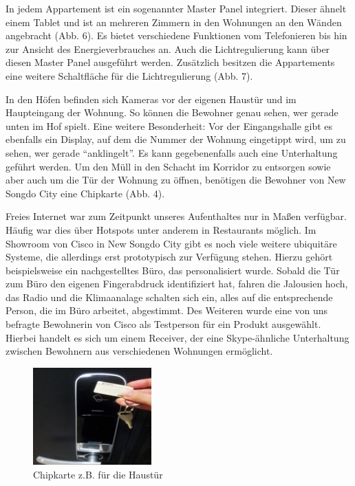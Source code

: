 \documentclass[a4paper,
fontsize=11pt,
oneside,
numbers=noperiodatend,
parskip=half-,
bibliography=totoc,
final
]{scrartcl}
\begin{document}
In jedem Appartement ist ein sogenannter Master Panel integriert. Dieser
ähnelt einem Tablet und ist an mehreren Zimmern in den Wohnungen an den
Wänden angebracht (Abb. 6). Es bietet verschiedene Funktionen vom
Telefonieren bis hin zur Ansicht des Energieverbrauches an. Auch die
Lichtregulierung kann über diesen Master Panel ausgeführt werden.
Zusätzlich besitzen die Appartements eine weitere Schaltfläche für die
Lichtregulierung (Abb. 7).

In den Höfen befinden sich Kameras vor der eigenen Haustür und im
Haupteingang der Wohnung. So können die Bewohner genau sehen, wer gerade
unten im Hof spielt. Eine weitere Besonderheit: Vor der Eingangshalle
gibt es ebenfalls ein Display, auf dem die Nummer der Wohnung eingetippt
wird, um zu sehen, wer gerade \enquote{anklingelt}. Es kann
gegebenenfalls auch eine Unterhaltung geführt werden. Um den Müll in den
Schacht im Korridor zu entsorgen sowie aber auch um die Tür der Wohnung
zu öffnen, benötigen die Bewohner von New Songdo City eine Chipkarte
(Abb. 4).

Freies Internet war zum Zeitpunkt unseres Aufenthaltes nur in Maßen
verfügbar. Häufig war dies über Hotspots unter anderem in Restaurants
möglich. Im Showroom von Cisco in New Songdo City gibt es noch viele
weitere ubiquitäre Systeme, die allerdings erst prototypisch zur
Verfügung stehen. Hierzu gehört beispielsweise ein nachgestelltes Büro,
das personalisiert wurde. Sobald die Tür zum Büro den eigenen
Fingerabdruck identifiziert hat, fahren die Jalousien hoch, das Radio
und die Klimaanalage schalten sich ein, alles auf die entsprechende
Person, die im Büro arbeitet, abgestimmt. Des Weiteren wurde eine von
uns befragte Bewohnerin von Cisco als Testperson für ein Produkt
ausgewählt. Hierbei handelt es sich um einem Receiver, der eine
Skype-ähnliche Unterhaltung zwischen Bewohnern aus verschiedenen
Wohnungen ermöglicht.

\begin{figure}[htbp]
\centering
\includegraphics{img/Abbildung4.jpg}
\caption{Chipkarte z.B. für die Haustür}
\end{figure}
\end{document}
